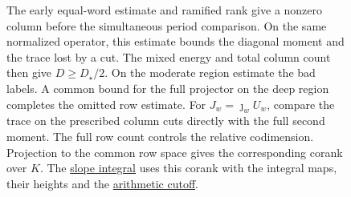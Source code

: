 \begin{figure}[!htbp]
\caption[The period and trace estimates in the rank bound]{The early
  equal-word estimate and ramified rank give a nonzero column before
  the simultaneous period comparison. On the same normalized operator,
  this estimate bounds the diagonal moment and the trace lost by a cut.
  The mixed energy and total column count then give \(D\ge D_\star/2\).
  On the moderate region estimate the bad labels. A common bound for
  the full projector on the deep region completes the omitted row
  estimate. For \(J_w=\jmath_w U_w\), compare the trace on
  the prescribed column cuts directly with the full second moment.
  The full row count controls the relative codimension.
  Projection to the common row space gives the
  corresponding corank over \(K\). The
  \hyperlink{proof.integrated-slope-deficit}{slope integral} uses this
  corank with the integral maps, their heights and the
  \hyperlink{proof.slope-at-height-scale}{arithmetic cutoff}.}
\label{fig:trace-handoffs}
\end{figure}
